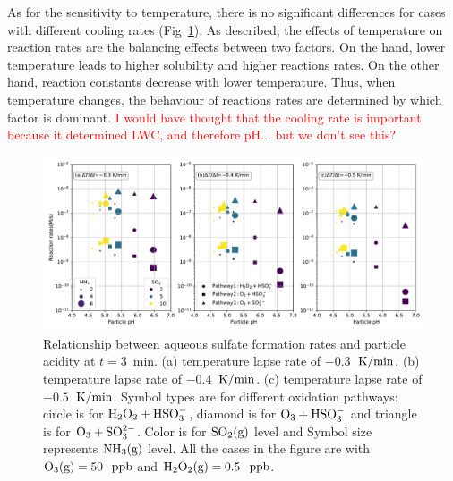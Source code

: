 \documentclass[edeposit,fullpage]{uiucthesis2009}
\makeatletter
\DeclareRobustCommand*\unit[1]
 {\ensuremath{%
   {\thinmuskip3mu\relax
    \def\mu{\text{\textmu}}\def~{\,}%
    \ifx\f@series\testbx\mathbf{#1}\else\mathrm{#1}\fi}}}
\makeatother
\begin{document}
As for the sensitivity to temperature, there is no significant
differences for cases with different cooling rates
(Fig~\ref{chap2:reac-rates}). As \citet{Seinfeld2016} described, the
effects of temperature on reaction rates are the balancing effects
between two factors. On the hand, lower temperature leads to higher
solubility and higher reactions rates. On the other hand, reaction
constants decrease with lower temperature. Thus, when temperature
changes, the behaviour of reactions rates are determined by which
factor is dominant.  \textcolor{red}{I would have thought that the
  cooling rate is important because it determined LWC, and therefore
  pH... but we don't see this?}

\begin{figure}[ht]
    \centering \includegraphics[scale=0.55]{chap2_figs/chap2_fig6_sulfate_pH.pdf}
    \caption{Relationship between aqueous sulfate formation rates and
      particle acidity at $t=3$~min. (a) temperature lapse rate of
      $-0.3$~\unit{K/min}. (b) temperature lapse rate of
      $-0.4$~\unit{K/min}. (c) temperature lapse rate of
      $-0.5$~\unit{K/min}. Symbol types are for different oxidation
      pathways: circle is for $\rm H_2O_2+ HSO_3^-$, diamond is for
      $\rm O_3+ HSO_3^-$ and triangle is for $\rm O_3+
      SO_3^{2-}$. Color is for $\rm SO_2(g)$ level and Symbol size
      represents $\rm NH_3(g)$ level. All the cases in the figure are
      with $\rm O_3(g) = 50$~\unit{ppb} and $\rm H_2O_2(g) =
      0.5$~\unit{ppb}.}
    \label{chap2:reac-rates}
\end{figure}
\end{document}
